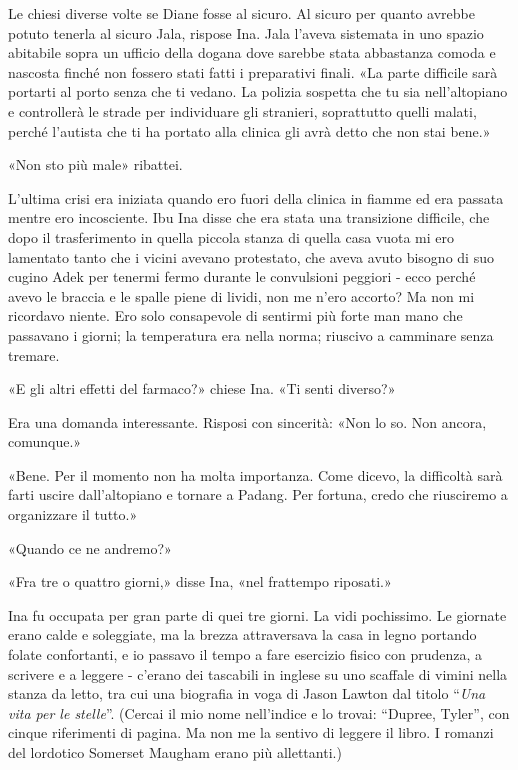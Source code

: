 Le chiesi diverse volte se Diane fosse al sicuro. Al sicuro per quanto
avrebbe potuto tenerla al sicuro Jala, rispose Ina. Jala l'aveva
sistemata in uno spazio abitabile sopra un ufficio della dogana dove
sarebbe stata abbastanza comoda e nascosta finché non fossero stati
fatti i preparativi finali. «La parte difficile sarà portarti al porto
senza che ti vedano. La polizia sospetta che tu sia nell'altopiano e
controllerà le strade per individuare gli stranieri, soprattutto quelli
malati, perché l'autista che ti ha portato alla clinica gli avrà detto
che non stai bene.»

«Non sto più male» ribattei.

L'ultima crisi era iniziata quando ero fuori della clinica in fiamme ed
era passata mentre ero incosciente. Ibu Ina disse che era stata una
transizione difficile, che dopo il trasferimento in quella piccola
stanza di quella casa vuota mi ero lamentato tanto che i vicini avevano
protestato, che aveva avuto bisogno di suo cugino Adek per tenermi fermo
durante le convulsioni peggiori - ecco perché avevo le braccia e le
spalle piene di lividi, non me n'ero accorto? Ma non mi ricordavo
niente. Ero solo consapevole di sentirmi più forte man mano che
passavano i giorni; la temperatura era nella norma; riuscivo a camminare
senza tremare.

«E gli altri effetti del farmaco?» chiese Ina. «Ti senti diverso?»

Era una domanda interessante. Risposi con sincerità: «Non lo so. Non
ancora, comunque.»

«Bene. Per il momento non ha molta importanza. Come dicevo, la
difficoltà sarà farti uscire dall'altopiano e tornare a Padang. Per
fortuna, credo che riusciremo a organizzare il tutto.»

«Quando ce ne andremo?»

«Fra tre o quattro giorni,» disse Ina, «nel frattempo riposati.»

\separatorefiori

Ina fu occupata per gran parte di quei tre giorni. La vidi pochissimo.
Le giornate erano calde e soleggiate, ma la brezza attraversava la casa
in legno portando folate confortanti, e io passavo il tempo a fare
esercizio fisico con prudenza, a scrivere e a leggere - c'erano dei
tascabili in inglese su uno scaffale di vimini nella stanza da letto,
tra cui una biografia in voga di Jason Lawton dal titolo ``\emph{Una
	vita per le stelle}''. (Cercai il mio nome nell'indice e lo trovai:
``Dupree, Tyler'', con cinque riferimenti di pagina. Ma non me la
sentivo di leggere il libro. I romanzi del lordotico Somerset Maugham
erano più allettanti.)

